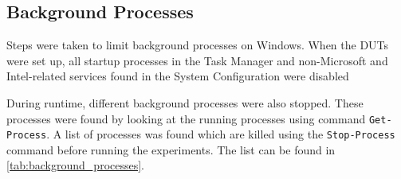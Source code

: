 

\subsection{Background Processes}\label{subsec:backgroundProcess}

Steps were taken to limit background processes on Windows. When the DUTs were set up, all startup processes in the Task Manager and non-Microsoft and Intel-related services found in the System Configuration were disabled

During runtime, different background processes were also stopped. These processes were found by looking at the running processes using command \texttt{Get-Process}. %
A list of processes was found which are killed using the \texttt{Stop-Process} command before running the experiments. The list can be found in \cref{tab:background_processes}.
